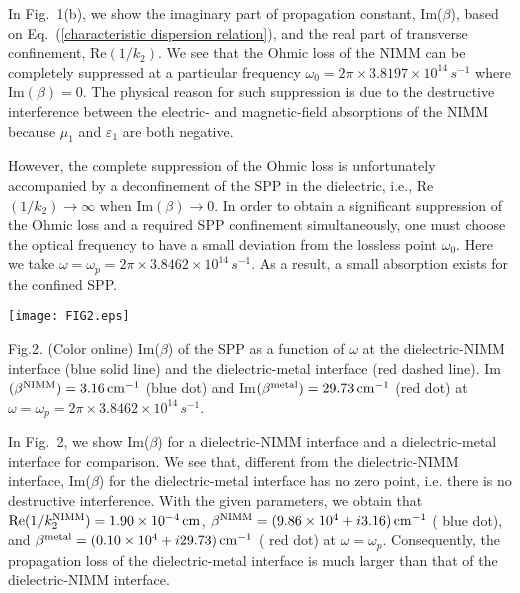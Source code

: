 \documentclass[aps,pra,preprint,groupedaddress,amsmath,amssymb,showpacs]{revtex4-1}
\begin{document}
\vskip 0.75cm


In Fig.~1(b), we show the imaginary part of propagation constant, Im($\beta$), based on Eq.~(\ref{characteristic dispersion relation}), and the real part of transverse confinement, Re$(1/k_2)$. We see that the Ohmic loss of the NIMM can be completely suppressed at a particular frequency $\omega_0=2\pi\times3.8197\times10^{14}\,{s^{-1}}$ where Im$(\beta)=0$. The physical reason for such suppression is due to the destructive interference between the electric- and magnetic-field absorptions of the NIMM because $\mu_1$ and $\varepsilon_1$ are both negative.

\vskip 0.75cm

However, the complete suppression of the Ohmic loss is unfortunately accompanied by a deconfinement of the SPP in the dielectric, i.e., Re$(1/k_2)\rightarrow\infty$ when Im$(\beta)\rightarrow0$. In order to obtain a significant suppression of the Ohmic loss and a required SPP confinement simultaneously, one must choose the optical frequency to have a small deviation from the lossless point $\omega_0$. Here we take $\omega=\omega_p=2\pi\times3.8462\times10^{14}\,{s^{-1}}$. As a result, a small absorption exists for the confined SPP.

%
\begin{center}
\texttt{[image: FIG2.eps]}
\end{center}
\vskip 0.5cm \small \rm Fig.\hspace{0.1cm}2. (Color online) Im($\beta$) of the SPP as a function of $\omega$ at the dielectric-NIMM interface (blue solid line) and the dielectric-metal interface (red dashed line). Im$(\beta^{\rm NIMM})=3.16\,{\rm cm^{-1}}$ ({\color{red}blue dot}) and Im$(\beta^{\rm metal})=29.73\,{\rm cm^{-1}}$ ({\color{red}red dot}) at $\omega=\omega_p=2\pi\times3.8462\times10^{14}\,{s^{-1}}$.
\vskip 0.8cm \noindent \normalsize
%

\vskip 0.75cm

In Fig.~2, we show Im($\beta$) for a dielectric-NIMM interface and a dielectric-metal interface for comparison. We see that, different from the dielectric-NIMM interface, Im($\beta$) for the dielectric-metal interface has no zero point, i.e. there is no destructive interference. With the given parameters, we obtain that ${\rm Re}(1/k_{2}^{\rm NIMM})=1.90\times10^{-4}\,{\rm cm}$, $\beta^{\rm NIMM}=(9.86\times10^4+i3.16)\,{\rm cm^{-1}}$ ({\color{red} blue dot}), and $\beta^{\rm metal}=(0.10\times10^4+i29.73)\,{\rm cm^{-1}}$ ({\color{red} red dot}) at $\omega=\omega_p$. Consequently, the propagation loss of the dielectric-metal interface is much larger than that of the dielectric-NIMM interface.
\end{document}
